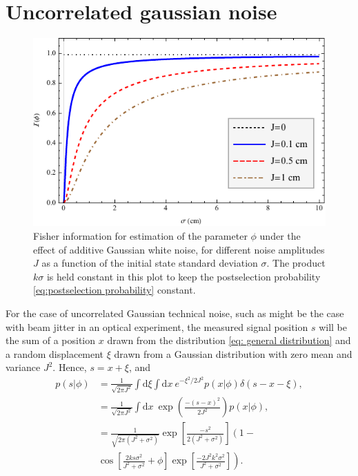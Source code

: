 \section{Uncorrelated gaussian noise}\label{sec:gaussian noise}
\begin{figure}
	\includegraphics[]{InverseWeakValueNoise/Figures/gaussianNoisePlot.pdf}
	\caption{Fisher information for estimation of the parameter $\phi$ under the effect of additive Gaussian white noise, for different noise amplitudes $J$ as a function of the initial state standard deviation $\sigma$.  The product $k\sigma$ is held constant in this plot to keep the postselection probability \eqref{eq:postselection probability} constant.  }
\end{figure}
For the case of uncorrelated Gaussian technical noise, such as might be the case with beam jitter in an optical experiment, the measured signal position $s$ will be the sum of a position $x$ drawn from the distribution \eqref{eq: general distribution} and a random displacement $\xi$ drawn from a Gaussian distribution with zero mean and variance $J^2$.  Hence, $s = x + \xi$, and 
\begin{align}\label{eq:gaussian noise distribution}
	p(s|\phi) &= \frac{1}{\sqrt{2\pi J^2}}\int \text{d}\xi\int \text{d}x~e^{-\xi^2/2J^2}p(x|\phi)\delta(s - x - \xi), \nonumber\\
	&= \frac{1}{\sqrt{2\pi J^2}}\int \text{d}x~\exp\left(\frac{-(s - x)^2}{2J^2}\right)p(x|\phi), \nonumber \\
	&\nonumber= \frac{1}{\sqrt{2\pi (J^2 + \sigma^2)}}\exp\left[\frac{-s^2}{2(J^2+\sigma^2)}\right]\left(1 - \right.\\ &\left.\cos\left[\frac{2ks\sigma^2}{J^2 + \sigma^2} + \phi \right]\exp\left[\frac{-2J^2k^2\sigma^2}{J^2 + \sigma^2}\right]\right).
\end{align}

